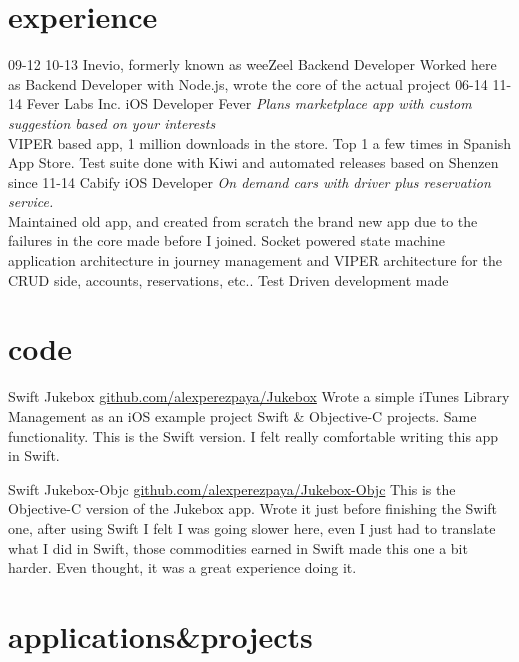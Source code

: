 \documentclass[]{perezpaya-cv}
\begin{document}
\section{experience}

\begin{entrylist}
  \entry
    {09-12 10-13}
    {Inevio, formerly known as weeZeel}
    {Backend Developer}
    {Worked here as Backend Developer with Node.js, wrote the core of the actual project}
  \entry
    {06-14 11-14}
    {Fever Labs Inc.}
    {iOS Developer}
    {Fever \emph{Plans marketplace app with custom suggestion based on your interests} \\VIPER based app, 1 million downloads in the store. Top 1 a few times in Spanish App Store. Test suite done with Kiwi and automated releases based on Shenzen}
  \entry
    {since 11-14}
    {Cabify}
    {iOS Developer}
    {\emph{On demand cars with driver plus reservation service.}
    \\Maintained old app, and created from scratch the brand new app due to the failures in the core made before I joined. Socket powered state machine application architecture in journey management and VIPER architecture for the CRUD side, accounts, reservations, etc.. Test Driven development made}
  \end{entrylist}

\section{code}
\begin{entrylist}
\entry
    {Swift}
    {Jukebox}
    {\href{http://github.com/alexperezpaya/Jukebox}{github.com/alexperezpaya/Jukebox}}
    {Wrote a simple iTunes Library Management as an iOS example project
Swift \& Objective-C projects. Same functionality. This is the Swift version. I felt really comfortable writing this app in Swift.}

\entry
    {Swift}
    {Jukebox-Objc}
    {\href{http://github.com/alexperezpaya/Jukebox-Objc}{github.com/alexperezpaya/Jukebox-Objc}}
    {This is the Objective-C version of the Jukebox app. Wrote it just before finishing the Swift one, after using Swift I felt I was going slower here, even I just had to translate what I did in Swift, those commodities earned in Swift made this one a bit harder. Even thought, it was a great experience doing it.}

\end{entrylist}

\section{applications\&projects}
\end{document}
